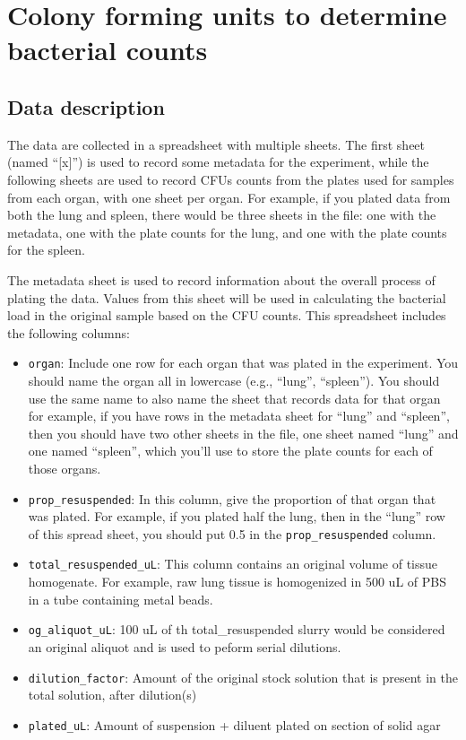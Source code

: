 \documentclass[
]{book}
\providecommand{\tightlist}{%
  \setlength{\itemsep}{0pt}\setlength{\parskip}{0pt}}
\begin{document}
\hypertarget{colony-forming-units-to-determine-bacterial-counts}{%
\chapter{Colony forming units to determine bacterial counts}\label{colony-forming-units-to-determine-bacterial-counts}}

\hypertarget{data-description}{%
\section{Data description}\label{data-description}}

The data are collected in a spreadsheet with multiple sheets. The first sheet
(named ``{[}x{]}'') is used to record some metadata for the experiment, while the
following sheets are used to record CFUs counts from the plates used for samples
from each organ, with one sheet per organ. For example, if you plated data
from both the lung and spleen, there would be three sheets in the file: one
with the metadata, one with the plate counts for the lung, and one with the
plate counts for the spleen.

The metadata sheet is used to record information about the overall process of
plating the data. Values from this sheet will be used in calculating the bacterial
load in the original sample based on the CFU counts. This spreadsheet includes
the following columns:

\begin{itemize}
\tightlist
\item
  \texttt{organ}: Include one row for each organ that was plated in the experiment.
  You should name the organ all in lowercase (e.g., ``lung'', ``spleen''). You
  should use the same name to also name the sheet that records data for that organ
  for example, if you have rows in the metadata sheet for ``lung'' and ``spleen'',
  then you should have two other sheets in the file, one sheet named ``lung'' and
  one named ``spleen'', which you'll use to store the plate counts for each of those
  organs.
\item
  \texttt{prop\_resuspended}: In this column, give the proportion of that organ that
  was plated. For example, if you plated half the lung, then in the ``lung'' row
  of this spread sheet, you should put 0.5 in the \texttt{prop\_resuspended} column.
\item
  \texttt{total\_resuspended\_uL}: This column contains an original volume of tissue homogenate. For example, raw lung tissue is homogenized in 500 uL of PBS in a tube containing metal beads.
\item
  \texttt{og\_aliquot\_uL}: 100 uL of th total\_resuspended slurry would be considered an original aliquot and is used to peform serial dilutions.
\item
  \texttt{dilution\_factor}: Amount of the original stock solution that is present in the total solution, after dilution(s)
\item
  \texttt{plated\_uL}: Amount of suspension + diluent plated on section of solid agar
\end{itemize}
\end{document}
